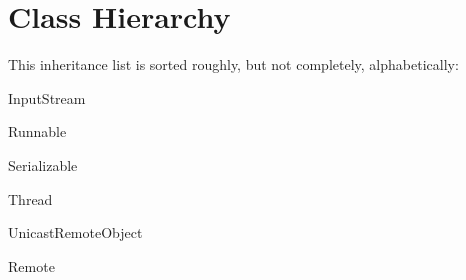 \section{Class Hierarchy}
This inheritance list is sorted roughly, but not completely, alphabetically\+:\begin{DoxyCompactList}
\item {}
\item Input\+Stream\begin{DoxyCompactList}
\item {}
\end{DoxyCompactList}
\item Runnable\begin{DoxyCompactList}
\item {}
\end{DoxyCompactList}
\item Serializable\begin{DoxyCompactList}
\item {}
\end{DoxyCompactList}
\item Thread\begin{DoxyCompactList}
\item {}
\end{DoxyCompactList}
\item Unicast\+Remote\+Object\begin{DoxyCompactList}
\item {}
\end{DoxyCompactList}
\item Remote\begin{DoxyCompactList}
\item {}
\begin{DoxyCompactList}
\item {}
\end{DoxyCompactList}
\item {}
\begin{DoxyCompactList}
\item {}
\end{DoxyCompactList}
\end{DoxyCompactList}
\end{DoxyCompactList}
